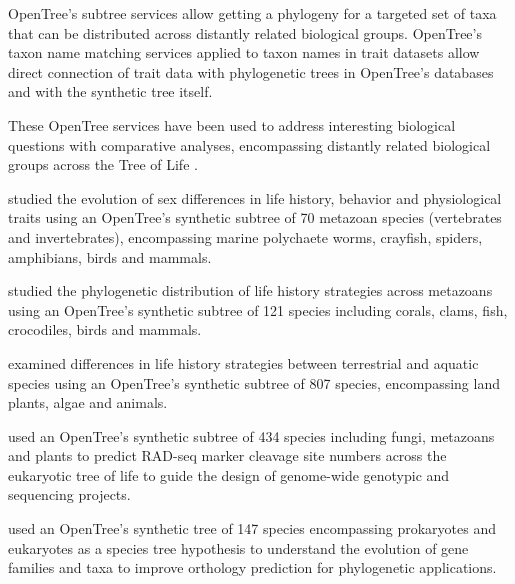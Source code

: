 \documentclass[oupdraft]{sysbio_sse}
\begin{document}
OpenTree's subtree services allow getting a phylogeny for a targeted set of taxa
that can be distributed across distantly related biological groups.
OpenTree's taxon name matching services applied to taxon names in trait datasets
allow direct connection of trait data with phylogenetic trees in OpenTree's databases
and with the synthetic tree itself.

These OpenTree services have been used to address interesting biological
questions with comparative analyses, encompassing distantly related biological groups across the Tree of Life
\citep{tarka2018sex, healy2019animal, herrera2015predicting, capdevila2020longevity, fisher2017evolution, boeckmann2015quest, uyeda2017evolution}.

\citep{tarka2018sex} studied the evolution of sex differences in life history, behavior
and physiological traits using an OpenTree's synthetic subtree of 70 metazoan species (vertebrates and invertebrates),
encompassing marine polychaete worms, crayfish, spiders, amphibians, birds and mammals.

\citep{healy2019animal} studied the phylogenetic distribution of life history strategies across metazoans
using an OpenTree's synthetic subtree of 121 species including corals, clams,
fish, crocodiles, birds and mammals.

\citep{capdevila2020longevity} examined differences in life history strategies between
terrestrial and aquatic species using an OpenTree's synthetic subtree of 807 species,
encompassing land plants, algae and animals.

\citep{herrera2015predicting} used an OpenTree's synthetic subtree of 434 species
including fungi, metazoans and plants to predict RAD-seq marker cleavage site numbers
across the eukaryotic tree of life to guide the design of genome-wide genotypic and
sequencing projects.

\citep{boeckmann2015quest} used an OpenTree's synthetic tree of 147 species encompassing
prokaryotes and eukaryotes as a species tree hypothesis to understand the evolution
of gene families and taxa to improve orthology prediction for phylogenetic applications.
\end{document}
